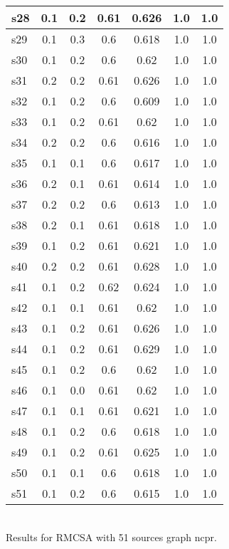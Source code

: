 \documentclass{article}
\begin{document}
\begin{tabular}{|l|c|c|c|c|c|c|}
\hline
s28 &0.1 & 0.2 & 0.61 & 0.626 & 1.0 & 1.0\\
\hline
s29 &0.1 & 0.3 & 0.6 & 0.618 & 1.0 & 1.0\\
\hline
s30 &0.1 & 0.2 & 0.6 & 0.62 & 1.0 & 1.0\\
\hline
s31 &0.2 & 0.2 & 0.61 & 0.626 & 1.0 & 1.0\\
\hline
s32 &0.1 & 0.2 & 0.6 & 0.609 & 1.0 & 1.0\\
\hline
s33 &0.1 & 0.2 & 0.61 & 0.62 & 1.0 & 1.0\\
\hline
s34 &0.2 & 0.2 & 0.6 & 0.616 & 1.0 & 1.0\\
\hline
s35 &0.1 & 0.1 & 0.6 & 0.617 & 1.0 & 1.0\\
\hline
s36 &0.2 & 0.1 & 0.61 & 0.614 & 1.0 & 1.0\\
\hline
s37 &0.2 & 0.2 & 0.6 & 0.613 & 1.0 & 1.0\\
\hline
s38 &0.2 & 0.1 & 0.61 & 0.618 & 1.0 & 1.0\\
\hline
s39 &0.1 & 0.2 & 0.61 & 0.621 & 1.0 & 1.0\\
\hline
s40 &0.2 & 0.2 & 0.61 & 0.628 & 1.0 & 1.0\\
\hline
s41 &0.1 & 0.2 & 0.62 & 0.624 & 1.0 & 1.0\\
\hline
s42 &0.1 & 0.1 & 0.61 & 0.62 & 1.0 & 1.0\\
\hline
s43 &0.1 & 0.2 & 0.61 & 0.626 & 1.0 & 1.0\\
\hline
s44 &0.1 & 0.2 & 0.61 & 0.629 & 1.0 & 1.0\\
\hline
s45 &0.1 & 0.2 & 0.6 & 0.62 & 1.0 & 1.0\\
\hline
s46 &0.1 & 0.0 & 0.61 & 0.62 & 1.0 & 1.0\\
\hline
s47 &0.1 & 0.1 & 0.61 & 0.621 & 1.0 & 1.0\\
\hline
s48 &0.1 & 0.2 & 0.6 & 0.618 & 1.0 & 1.0\\
\hline
s49 &0.1 & 0.2 & 0.61 & 0.625 & 1.0 & 1.0\\
\hline
s50 &0.1 & 0.1 & 0.6 & 0.618 & 1.0 & 1.0\\
\hline
s51 &0.1 & 0.2 & 0.6 & 0.615 & 1.0 & 1.0\\
\hline
\end{tabular}\\

\noindent Results for RMCSA with 51 sources graph ncpr.
\end{document}
